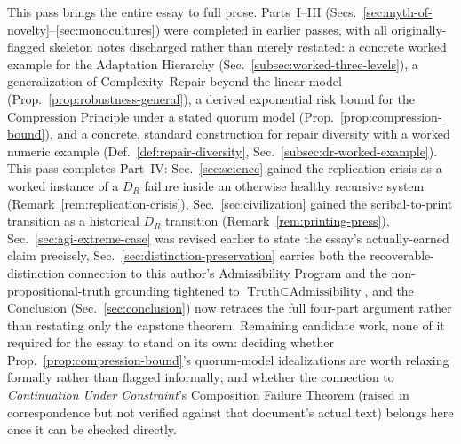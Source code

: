 \documentclass[12pt,a4paper]{article}
\theoremstyle{plain}
\theoremstyle{definition}
\theoremstyle{remark}
\newcommand{\DR}{D_R}
\begin{document}
This pass brings the entire essay to full prose. Parts~I--III (Secs.~\ref{sec:myth-of-novelty}--\ref{sec:monocultures}) were completed in earlier passes, with all originally-flagged skeleton notes discharged rather than merely restated: a concrete worked example for the Adaptation Hierarchy (Sec.~\ref{subsec:worked-three-levels}), a generalization of Complexity--Repair beyond the linear model (Prop.~\ref{prop:robustness-general}), a derived exponential risk bound for the Compression Principle under a stated quorum model (Prop.~\ref{prop:compression-bound}), and a concrete, standard construction for repair diversity with a worked numeric example (Def.~\ref{def:repair-diversity}, Sec.~\ref{subsec:dr-worked-example}). This pass completes Part~IV: Sec.~\ref{sec:science} gained the replication crisis as a worked instance of a $\DR$ failure inside an otherwise healthy recursive system (Remark~\ref{rem:replication-crisis}), Sec.~\ref{sec:civilization} gained the scribal-to-print transition as a historical $\DR$ transition (Remark~\ref{rem:printing-press}), Sec.~\ref{sec:agi-extreme-case} was revised earlier to state the essay's actually-earned claim precisely, Sec.~\ref{sec:distinction-preservation} carries both the recoverable-distinction connection to this author's Admissibility Program and the non-propositional-truth grounding tightened to $\text{Truth}\subseteq\text{Admissibility}$, and the Conclusion (Sec.~\ref{sec:conclusion}) now retraces the full four-part argument rather than restating only the capstone theorem. Remaining candidate work, none of it required for the essay to stand on its own: deciding whether Prop.~\ref{prop:compression-bound}'s quorum-model idealizations are worth relaxing formally rather than flagged informally; and whether the connection to \emph{Continuation Under Constraint}'s Composition Failure Theorem (raised in correspondence but not verified against that document's actual text) belongs here once it can be checked directly.
\end{document}

